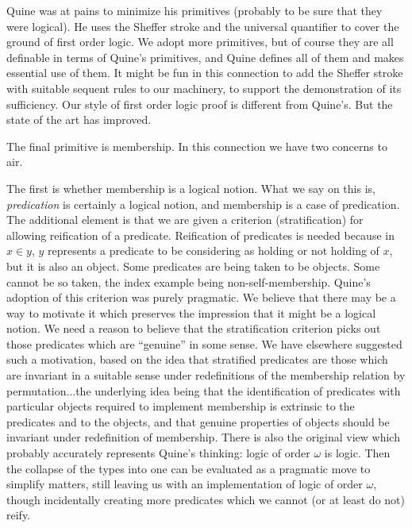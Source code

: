 \documentclass{article}
\begin{document}
 Quine was at pains to minimize his primitives (probably to be sure that they were logical).  He uses the Sheffer stroke and the universal quantifier to cover the ground of first order logic.  We adopt more primitives, but of course they are all definable in terms of Quine's primitives, and Quine defines all of them and makes essential use of them.  It might be fun in this connection to add the Sheffer stroke with suitable sequent rules to our machinery, to support the demonstration of its sufficiency.   Our style of first order logic proof is different from Quine's.  But the state of the art has improved.
 
 The final primitive is membership.  In this connection we have two concerns to air.
 
 The first is whether membership is a logical notion.  What we say on this is, {\em predication\/} is certainly a logical notion, and membership is a case of predication.  The additional element is that we are given a criterion (stratification) for allowing reification of a predicate.  Reification of predicates is needed because in $x \in y$, $y$ represents a predicate to be considering as holding or not holding of $x$, but it is also an object.  Some predicates are being taken to be objects.  Some cannot be so taken, the index example being non-self-membership.  Quine's adoption of this criterion was purely pragmatic.  We believe that there may be a way to motivate it which preserves the impression that it might be a logical notion.   We need a reason to believe that the stratification criterion picks out those predicates which are ``genuine'' in some sense.  We have elsewhere suggested such a motivation, based on the idea that stratified predicates are those which are invariant in a suitable sense under redefinitions of the membership relation by permutation...the underlying idea being that the identification of predicates with particular objects required to implement membership is extrinsic to the predicates and to the objects, and that genuine properties of objects should be invariant under redefinition of membership.   There is also the original view which probably accurately represents Quine's thinking:  logic of order $\omega$ is logic.  Then the
 collapse of the types into one can be evaluated as a pragmatic move to simplify matters, still leaving us with an implementation of logic of order $\omega$, though incidentally creating more predicates which we cannot (or at least do not) reify.
 
\end{document}
